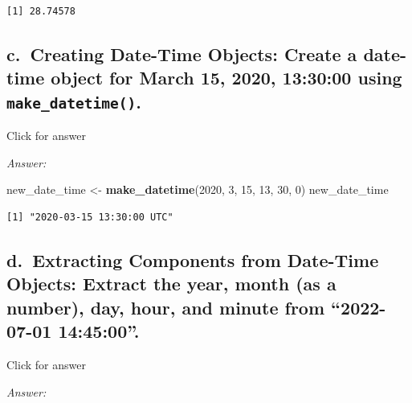 \documentclass[
]{book}
\newenvironment{Shaded}{\begin{snugshade}}{\end{snugshade}}
\newcommand{\DecValTok}[1]{\textcolor[rgb]{0.00,0.00,0.81}{#1}}
\newcommand{\FunctionTok}[1]{\textcolor[rgb]{0.13,0.29,0.53}{\textbf{#1}}}
\newcommand{\NormalTok}[1]{#1}
\newcommand{\OtherTok}[1]{\textcolor[rgb]{0.56,0.35,0.01}{#1}}
\begin{document}
\begin{verbatim}
[1] 28.74578
\end{verbatim}

\hypertarget{c.-creating-date-time-objects-create-a-date-time-object-for-march-15-2020-133000-using-make_datetime.}{%
\subsection{\texorpdfstring{c.~Creating Date-Time Objects: Create a date-time object for March 15, 2020, 13:30:00 using \texttt{make\_datetime()}.}{c.~Creating Date-Time Objects: Create a date-time object for March 15, 2020, 13:30:00 using make\_datetime().}}\label{c.-creating-date-time-objects-create-a-date-time-object-for-march-15-2020-133000-using-make_datetime.}}

Click for answer

\emph{Answer:}

\begin{Shaded}
\begin{Highlighting}[]
\NormalTok{new\_date\_time }\OtherTok{\textless{}{-}} \FunctionTok{make\_datetime}\NormalTok{(}\DecValTok{2020}\NormalTok{, }\DecValTok{3}\NormalTok{, }\DecValTok{15}\NormalTok{, }\DecValTok{13}\NormalTok{, }\DecValTok{30}\NormalTok{, }\DecValTok{0}\NormalTok{)}
\NormalTok{new\_date\_time}
\end{Highlighting}
\end{Shaded}

\begin{verbatim}
[1] "2020-03-15 13:30:00 UTC"
\end{verbatim}

\hypertarget{d.-extracting-components-from-date-time-objects-extract-the-year-month-as-a-number-day-hour-and-minute-from-2022-07-01-144500.}{%
\subsection{d.~Extracting Components from Date-Time Objects: Extract the year, month (as a number), day, hour, and minute from ``2022-07-01 14:45:00''.}\label{d.-extracting-components-from-date-time-objects-extract-the-year-month-as-a-number-day-hour-and-minute-from-2022-07-01-144500.}}

Click for answer

\emph{Answer:}
\end{document}
